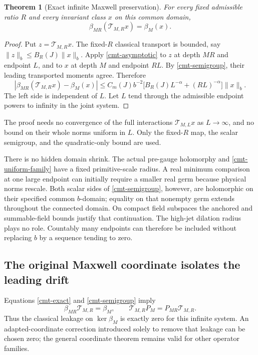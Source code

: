 \documentclass[11pt]{article}
\newtheorem{theorem}{Theorem}[section]
\theoremstyle{remark}
\begin{document}
\begin{theorem}[Exact infinite Maxwell preservation]
\label{cmt-theorem}
For every fixed admissible ratio \(R\) and every invariant
class \(x\) on this common domain,
\begin{equation}
       \beta_{MR}(\mathcal T_{M,R}x)=\beta_M(x).
 \label{cmt-exact}
\end{equation}
\end{theorem}
\begin{proof}
Put \(z=\mathcal T_{M,R}x\). The fixed-\(R\) classical
transport is bounded, say
\(\|z\|_b\le B_R(J)\|x\|_b\). Apply
\eqref{cmt-asymptotic} to \(z\) at depth \(MR\) and
endpoint \(L\), and to \(x\) at depth \(M\) and endpoint
\(RL\). By \eqref{cmt-semigroup}, their leading transported
moments agree. Therefore
\begin{equation}
 |\beta_{MR}(\mathcal T_{M,R}x)-\beta_M(x)|
 \le C_m(J)b^{-2}
       \bigl[B_R(J)L^{-\alpha}+(RL)^{-\alpha}\bigr]\|x\|_b.
 \label{cmt-comparison}
\end{equation}
The left side is independent of \(L\). Let \(L\) tend through
the admissible endpoint powers to infinity in the joint
system.
\end{proof}

The proof needs no convergence of the full interactions
\(\mathcal T_{M,L}x\) as \(L\to\infty\), and no bound on
their whole norms uniform in \(L\). Only the fixed-\(R\)
map, the scalar semigroup, and the quadratic-only bound
are used.

There is no hidden domain shrink. The actual pre-gauge
holomorphy and \eqref{cmt-uniform-family} have a fixed
primitive-scale radius. A real minimum comparison at
one large endpoint can initially require a smaller real
germ because physical norms rescale. Both scalar sides
of \eqref{cmt-semigroup}, however, are holomorphic on
their specified common \(b\)-domain; equality on that
nonempty germ extends throughout the connected domain.
On compact field subspaces the anchored and summable-field
bounds justify that continuation. The high-jet dilation
radius plays no role. Countably many endpoints can
therefore be included without replacing \(b\) by a
sequence tending to zero.

\subsection{The original Maxwell coordinate isolates the leading drift}
\label{cmt-drift-section}

Equations \eqref{cmt-exact} and \eqref{cmt-semigroup} imply
\begin{equation}
 \beta_{MR}\mathcal T_{M,R}=\beta_M,\qquad
 \mathcal T_{M,R}P_M=P_{MR}\mathcal T_{M,R}.
 \label{cmt-commutation}
\end{equation}
Thus the classical leakage on \(\ker\beta_M\) is exactly
zero for this infinite system. An adapted-coordinate
correction introduced solely to remove that leakage
can be chosen zero; the general coordinate theorem
remains valid for other operator families.
\end{document}
